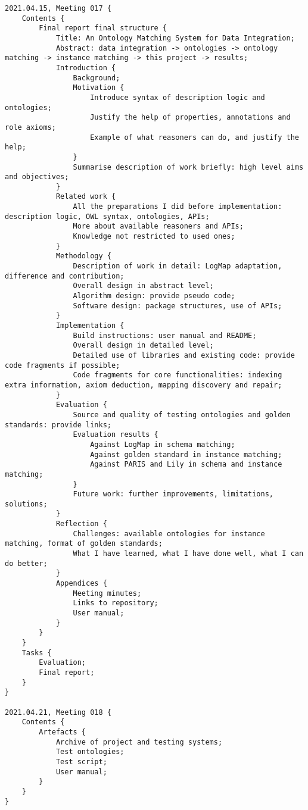 \begin{appendices}
\begin{spacing}{1.0}
\begin{lstlisting}
2021.04.15, Meeting 017 {
	Contents {
		Final report final structure {
			Title: An Ontology Matching System for Data Integration;
			Abstract: data integration -> ontologies -> ontology matching -> instance matching -> this project -> results;
			Introduction {
				Background;
				Motivation {
					Introduce syntax of description logic and ontologies;
					Justify the help of properties, annotations and role axioms;
					Example of what reasoners can do, and justify the help;
				}
				Summarise description of work briefly: high level aims and objectives;
			}
			Related work {
				All the preparations I did before implementation: description logic, OWL syntax, ontologies, APIs;
				More about available reasoners and APIs;
				Knowledge not restricted to used ones;
			}
			Methodology {
				Description of work in detail: LogMap adaptation, difference and contribution;
				Overall design in abstract level;
				Algorithm design: provide pseudo code;
				Software design: package structures, use of APIs;
			}
			Implementation {
				Build instructions: user manual and README;
				Overall design in detailed level;
				Detailed use of libraries and existing code: provide code fragments if possible;
				Code fragments for core functionalities: indexing extra information, axiom deduction, mapping discovery and repair;
			}
			Evaluation {
				Source and quality of testing ontologies and golden standards: provide links;
				Evaluation results {
					Against LogMap in schema matching;
					Against golden standard in instance matching;
					Against PARIS and Lily in schema and instance matching;
				}
				Future work: further improvements, limitations, solutions;
			}
			Reflection {
				Challenges: available ontologies for instance matching, format of golden standards;
				What I have learned, what I have done well, what I can do better;
			}
			Appendices {
				Meeting minutes;
				Links to repository;
				User manual;
			}
		}
	}
	Tasks {
		Evaluation;
		Final report;
	}
}

2021.04.21, Meeting 018 {
	Contents {
		Artefacts {
			Archive of project and testing systems;
			Test ontologies;
			Test script;
			User manual;
		}
	}
}
\end{lstlisting}
\end{spacing}

\end{appendices}
